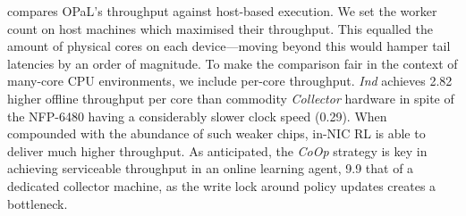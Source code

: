 \documentclass[
conference
,10pt
]{IEEEtran}
\newcommand{\approachshort}{OPaL}
\newcommand{\Coopfw}{\emph{CoOp}}
\newcommand{\Indfw}{\emph{Ind}}
\begin{document}

\newlength{\resultplotwidth}
\setlength{\resultplotwidth}{0.849\linewidth}

\begin{table}
	\caption{Latencies and computation times for \approachshort{} versus commodity hardware hosts. On-device execution is crucial in not only lowering latencies, but in reducing tail latencies. Lower is better, with the best marked \emph{in bold}.\label{tab:lats}}
\end{table}

\begin{table}
	\caption{Action and update throughputs for \approachshort{} versus commodity hardware hosts. Most designs cannot scale online performance with additional cores. Higher is better, with the best marked \emph{in bold}.\label{tab:tputs}}
\end{table}

 compares \approachshort{}'s throughput against host-based execution.
We set the worker count on host machines which maximised their throughput.
This equalled the amount of physical cores on each device---moving beyond this would hamper tail latencies by an order of magnitude.
To make the comparison fair in the context of many-core CPU environments, we include per-core throughput.
\Indfw{} achieves \SI{2.82}{\texttimes} higher offline throughput per core than commodity \emph{Collector} hardware in spite of the NFP-6480 having a considerably slower clock speed (\SI{0.29}{\texttimes}).
When compounded with the abundance of such weaker chips, in-NIC RL is able to deliver much higher throughput.
As anticipated, the \Coopfw{} strategy is key in achieving serviceable throughput in an online learning agent, \SI{9.9}{\texttimes} that of a dedicated collector machine, as the write lock around policy updates creates a bottleneck.
\end{document}
